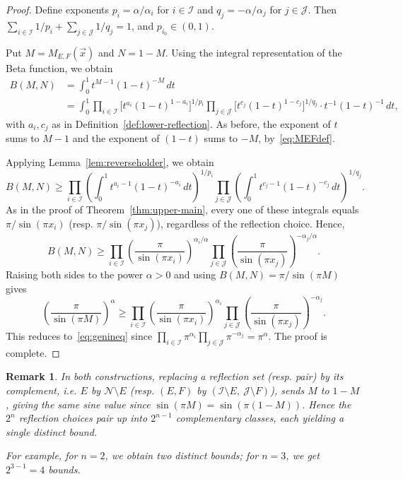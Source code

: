 \documentclass[12pt]{amsart}
\newtheorem{remark}{Remark}[section]
\theoremstyle{definition}
\begin{document}
\begin{proof}
Define exponents $p_i = \alpha/\alpha_i$ for $i\in\mathcal I$ and $q_j = -\alpha/\alpha_j$
for $j\in\mathcal J$. Then $\sum_{i\in\mathcal I} 1/p_i + \sum_{j\in\mathcal J} 1/q_j = 1$,
and $p_{i_0}\in(0,1)$.

Put $M = M_{E,F}(\vec x)$ and $N = 1-M$. Using the integral representation of the Beta
function, we obtain
\begin{align*}
B(M,N) &= \int_0^1 t^{M-1}(1-t)^{-M}\,dt \\
&= \int_0^1 \prod_{i\in\mathcal I} \bigl[ t^{a_i}(1-t)^{1-a_i} \bigr]^{1/p_i}
         \prod_{j\in\mathcal J} \bigl[ t^{c_j}(1-t)^{1-c_j} \bigr]^{1/q_j}
         \cdot t^{-1}(1-t)^{-1} \, dt,
\end{align*}
with $a_i,c_j$ as in Definition~\ref{def:lower-reflection}. As before, the exponent of $t$
sums to $M-1$ and the exponent of $(1-t)$ sums to $-M$, by~\eqref{eq:MEFdef}.

Applying Lemma~\ref{lem:reverseholder}, we obtain
\[
B(M,N) \ge \prod_{i\in\mathcal I} \left( \int_0^1 t^{a_i-1}(1-t)^{-a_i} \, dt \right)^{1/p_i}
         \prod_{j\in\mathcal J} \left( \int_0^1 t^{c_j-1}(1-t)^{-c_j} \, dt \right)^{1/q_j}.
\]
As in the proof of Theorem~\ref{thm:upper-main}, every one of these integrals equals
$\pi/\sin(\pi x_i)$ (resp. $\pi/\sin(\pi x_j)$), regardless of the reflection choice. Hence,
\[
B(M,N) \ge \prod_{i\in\mathcal I} \left( \frac{\pi}{\sin(\pi x_i)} \right)^{\alpha_i/\alpha}
         \prod_{j\in\mathcal J} \left( \frac{\pi}{\sin(\pi x_j)} \right)^{-\alpha_j/\alpha}.
\]
Raising both sides to the power $\alpha>0$ and using $B(M,N)=\pi/\sin(\pi M)$ gives
\[
\left(\frac{\pi}{\sin(\pi M)}\right)^{\alpha} \ge \prod_{i\in\mathcal I} \left( \frac{\pi}{\sin(\pi x_i)} \right)^{\alpha_i}
         \prod_{j\in\mathcal J} \left( \frac{\pi}{\sin(\pi x_j)} \right)^{-\alpha_j}.
\]
This reduces to~\eqref{eq:genineq} since $\displaystyle\prod_{i\in\mathcal I}\pi^{\alpha_i}\prod_{j\in\mathcal J}\pi^{-\alpha_j}=\pi^\alpha$.
The proof is complete.
\end{proof}

\begin{remark}\label{rmk:counting}
In both constructions, replacing a reflection set (resp. pair) by its complement, i.e. 
$E$ by $\mathcal N\setminus E$ (resp. $(E,F)$ by $(\mathcal I\setminus E,\ \mathcal J\setminus F)$), 
sends $M$ to $1-M$, giving the same sine value since $\sin(\pi M)=\sin(\pi(1-M))$. Hence the
$2^n$ reflection choices pair up into $2^{n-1}$ complementary classes, each yielding a single
distinct bound. 

For example, for $n=2$, we obtain two distinct bounds; for $n=3$, we get $2^{3-1}=4$ bounds.
\end{remark}
\end{document}
